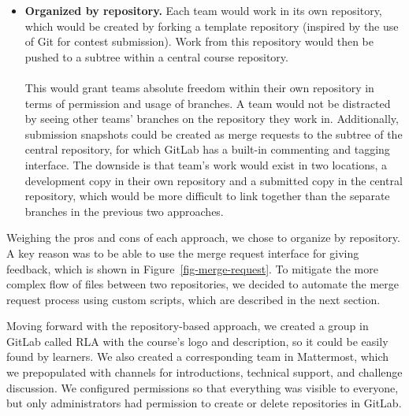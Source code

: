 \documentclass[12pt,twoside]{mitthesis}
\begin{document}
{\begin{itemize}
The drawback of this method is the disparity between such use of branches and what branches are typically used for. Branches are usually for work-in-progress features or experiments with the intention of eventually merging the branch back. However, here they would be used by teams pursuing totally separate projects in the same place on different branches, which wouldn't make sense to eventually merge. This disparity would potentially confuse users previously familiar with Git and teach improper skills for those who go on to use Git beyond the course.
\item \textbf{Organized by repository.} Each team would work in its own repository, which would be created by forking a template repository (inspired by the use of Git for contest submission). Work from this repository would then be pushed to a subtree within a central course repository.\\ \\
This would grant teams absolute freedom within their own repository in terms of permission and usage of branches. A team would not be distracted by seeing other teams' branches on the repository they work in. Additionally, submission snapshots could be created as merge requests to the subtree of the central repository, for which GitLab has a built-in commenting and tagging interface. The downside is that team's work would exist in two locations, a development copy in their own repository and a submitted copy in the central repository, which would be more difficult to link together than the separate branches in the previous two approaches.
\end{itemize}
Weighing the pros and cons of each approach, we chose to organize by repository. A key reason was to be able to use the merge request interface for giving feedback, which is shown in Figure~\ref{fig-merge-request}. To mitigate the more complex flow of files between two repositories, we decided to automate the merge request process using custom scripts, which are described in the next section.

Moving forward with the repository-based approach, we created a group in GitLab called RLA with the course's logo and description, so it could be easily found by learners. We also created a corresponding team in Mattermost, which we prepopulated with channels for introductions, technical support, and challenge discussion. We configured permissions so that everything was visible to everyone, but only administrators had permission to create or delete repositories in GitLab.

}
\end{document}
